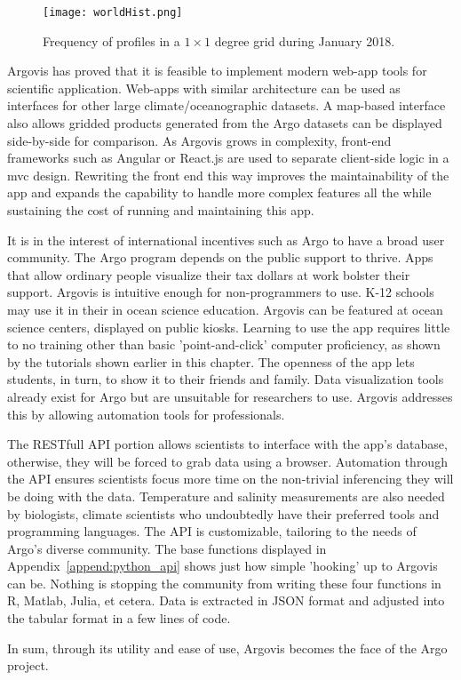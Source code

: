 \begin{figure}[H]
\centering
\begin{minipage}{6in}
\texttt{[image: worldHist.png]}
\caption{\label{fig:worldHist}Frequency of profiles in a $1\times 1$ degree grid during January 2018.}
\end{minipage}
\end{figure}


Argovis has proved that it is feasible to implement modern web-app tools for scientific application. Web-apps with similar architecture can be used as interfaces for other large climate/oceanographic datasets. A map-based interface also allows gridded products generated from the Argo datasets can be displayed side-by-side for comparison. As Argovis grows in complexity, front-end frameworks such as Angular or React.js are used to separate client-side logic in a \gls{mvc} design. Rewriting the front end this way improves the maintainability of the app and expands the capability to handle more complex features all the while sustaining the cost of running and maintaining this app.

It is in the interest of international incentives such as Argo to have a broad user community. The Argo program depends on the public support to thrive. Apps that allow ordinary people visualize their tax dollars at work bolster their support. Argovis is intuitive enough for non-programmers to use. K-12 schools may use it in their in ocean science education. Argovis can be featured at ocean science centers, displayed on public kiosks. Learning to use the app requires little to no training other than basic 'point-and-click' computer proficiency, as shown by the tutorials shown earlier in this chapter. The openness of the app lets students, in turn, to show it to their friends and family. Data visualization tools already exist for Argo but are unsuitable for researchers to use. Argovis addresses this by allowing automation tools for professionals.

The RESTfull API portion allows scientists to interface with the app's database, otherwise, they will be forced to grab data using a browser. Automation through the API ensures scientists focus more time on the non-trivial inferencing they will be doing with the data. Temperature and salinity measurements are also needed by biologists, climate scientists who undoubtedly have their preferred tools and programming languages. The API is customizable, tailoring to the needs of Argo's diverse community. The base functions displayed in Appendix~\ref{append:python_api} shows just how simple 'hooking' up to Argovis can be. Nothing is stopping the community from writing these four functions in R, Matlab, Julia, et cetera. Data is extracted in JSON format and adjusted into the tabular format in a few lines of code.

In sum, through its utility and ease of use, Argovis becomes the face of the Argo project. 
